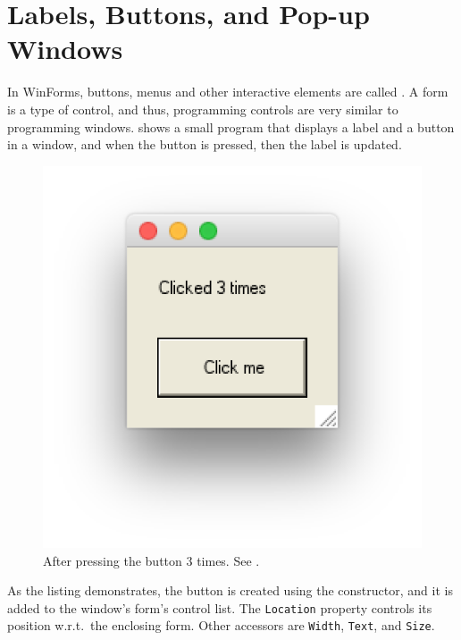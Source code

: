 \documentclass[fsharpnotes.tex]{subfiles}
\begin{document}
\section{Labels, Buttons, and Pop-up Windows}
In WinForms, buttons, menus and other interactive elements are called . A form is a type of control, and thus, programming controls are very similar to programming windows.  shows a small program that displays a label and a button in a window, and when the button is pressed, then the label is updated.
%
%
\begin{figure}
  \centering
  \includegraphics[scale=0.3]{buttonControl}
  \caption{After pressing the button 3 times. See .}
  \label{fig:buttonControl}
\end{figure}
%
As the listing demonstrates, the button is created using the  constructor, and it is added to the window's form's control list. The \lstinline{Location} property controls its position w.r.t.\ the enclosing form. Other accessors are \lstinline{Width}, \lstinline{Text}, and \lstinline{Size}.
\end{document}
